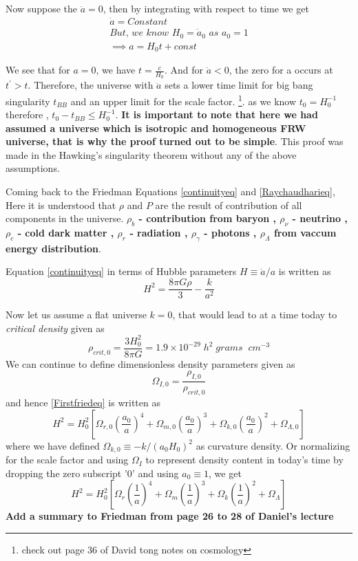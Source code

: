 \documentclass[12pt]{report}
\newcommand{\tbf}[1]{\textbf{#1}}
\newcommand{\tit}[1]{\textit{#1}}
\newcommand{\fn}[1]{\footnote{#1}}
\begin{document}
Now suppose the $\ddot{a}=0$, then by integrating with respect to time we get 
\begin{eqnarray*}
\dot{a}=Constant\\
\tit{But, we know $H_0=\dot{a}_0$ as $a_0=1$}\\
\implies a=H_0 t + const
\end{eqnarray*}

We see that for $a=0$, we have $t=\frac{c}{H_0}$. And for $\ddot{a}<0$, the zero for a occurs at $t^{\prime}>t$. Therefore, the universe with $\ddot{a}$ sets a lower time limit for big bang singularity $t_{BB}$ and an upper limit for the scale factor. \fn{check out page 36 of David tong notes on cosmology}. as we know $t_0= H_0^{-1}$ therefore , $t_0- t_{BB} \leq H_0^{-1}$. \tbf{It is important to note that here we had assumed a universe which is isotropic and homogeneous FRW universe, that is why the proof turned out to be simple}. This proof was made in the Hawking's singularity theorem without any of the above assumptions.


Coming back to the Friedman Equations \eqref{continuityeq} and \eqref{Raychaudharieq}, Here it is understood that $\rho$ and $P$ are the result of contribution of all components in the universe. \tbf{$\rho_b$ - contribution from baryon , $\rho_\nu$ - neutrino , $\rho_c$ - cold dark matter , $\rho_r$ - radiation , $\rho_\gamma$ -  photons , $\rho_\Lambda$ from vaccum energy distribution}.

Equation \eqref{continuityeq} in terms of Hubble parameters $H \equiv \dot{a}/a$ is written as
\begin{equation}\label{Firstfriedeq}
H^2=\frac{8 \pi G \rho}{3} - \frac{k}{a^2}
\end{equation} 

Now let us assume a flat universe $k=0$, that would lead to at a time today to \tit{critical density} given as 
\begin{equation}
\rho_{crit,0}=\frac{3H_0^2}{8 \pi G}= 1.9 \times 10^{-29} \; h^2 \; grams \; \; cm^{-3}
\end{equation}
We can continue to define dimensionless density parameters given as 
\begin{equation}
\Omega_{I,0}= \frac{\rho_{I,0}}{\rho_{crit,0}}
\end{equation}
and hence \eqref{Firstfriedeq} is written as 
\begin{equation}
H^2= H_0^2 \left[\Omega_{r,0}\left(\frac{a_0}{a}\right)^4+\Omega_{m,0}\left(\frac{a_0}{a}\right)^3+\Omega_{k,0}\left(\frac{a_0}{a}\right)^2+\Omega_{\Lambda,0}\right]
\end{equation}
where we have defined $\Omega_{k,0} \equiv -k/(a_0 H_0)^2$ as curvature density. Or normalizing for the scale factor and using $\Omega_I$ to represent density content in today's time by dropping the zero subscript '0' and using $a_0 \equiv 1$, we get
\begin{equation}
H^2= H_0^2 \left[\Omega_{r}\left(\frac{1}{a}\right)^4+\Omega_{m}\left(\frac{1}{a}\right)^3+\Omega_{k}\left(\frac{1}{a}\right)^2+\Omega_{\Lambda}\right]
\end{equation}
\tbf{Add a summary to Friedman from page 26 to 28 of Daniel's lecture}
\newpage
\end{document}
